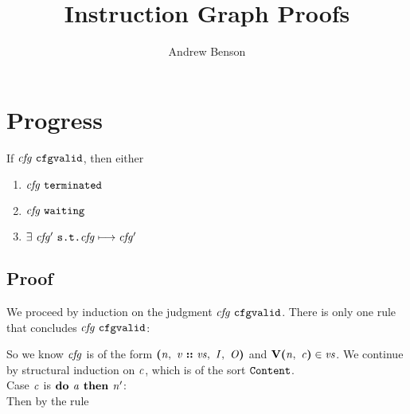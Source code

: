 \documentclass[12pt]{article}
\title{Instruction Graph Proofs}
\author{Andrew Benson}
\date{}
\begin{document}
\maketitle

\thispagestyle{simple}

\section{Progress}

If $\cfgvalid{\nterm{cfg}}$, then either
\begin{enumerate}
  \item $\terminated{\nterm{cfg}}$
  \item $\waiting{\nterm{cfg}}$
  \item $\exists\ \nterm{cfg'}\ \texttt{s.t.} \steps{\nterm{cfg}}{\nterm{cfg'}}$
\end{enumerate}

\subsection{Proof}

We proceed by induction on the judgment $\cfgvalid{\nterm{cfg}}$. There is only
one rule that concludes $\cfgvalid{\nterm{cfg}}$:

\begin{mathpar}
\end{mathpar}

So we know $\nterm{cfg}$ is of the form
$\cfg{\nterm{n}}{\cons{\nterm{v}}{\nterm{vs}}}{\nterm{I}}{\nterm{O}}$ and
$\ver{\nterm{n}}{\nterm{c}} \in \nterm{vs}$. We continue by structural
induction on $\nterm{c}$, which is of the sort $\sort{Content}$.\\

Case $\nterm{c}$ is $\doonce{\nterm{a}}{\nterm{n'}}$:\\

Then by the rule

\begin{mathpar}
\end{mathpar}
\end{document}
